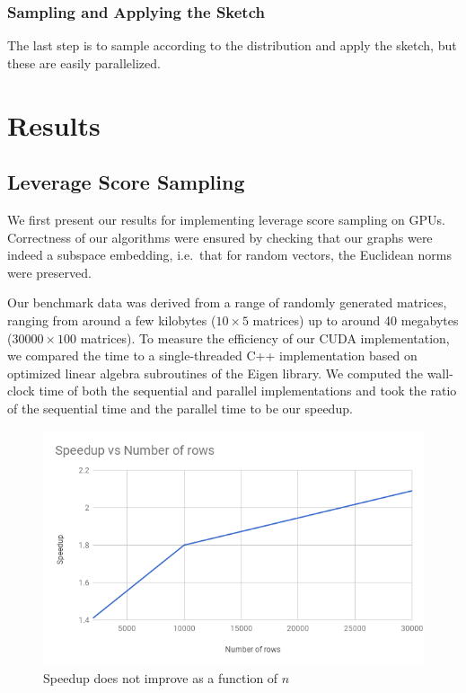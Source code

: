 \documentclass[12pt]{article}
\begin{document}
\subsubsection{Sampling and Applying the Sketch}
The last step is to sample according to the distribution and apply the sketch, but these are easily parallelized.

\section{Results}

\subsection{Leverage Score Sampling}
We first present our results for implementing leverage score sampling on GPUs. Correctness of our algorithms were ensured by checking that our graphs were indeed a subspace embedding, i.e.\ that for random vectors, the Euclidean norms were preserved. 

Our benchmark data was derived from a range of randomly generated matrices, ranging from around a few kilobytes ($10\times 5$ matrices) up to around 40 megabytes ($30000\times 100$ matrices). To measure the efficiency of our CUDA implementation, we compared the time to a single-threaded C++ implementation based on optimized linear algebra subroutines of the Eigen library. We computed the wall-clock time of both the sequential and parallel implementations and took the ratio of the sequential time and the parallel time to be our speedup. 

\begin{figure}[ht]
\centering
\label{speedup-vs-rows}
\includegraphics[scale=0.7]{speedup-vs-rows}
\caption{Speedup does not improve as a function of $n$}
\end{figure}
\end{document}
